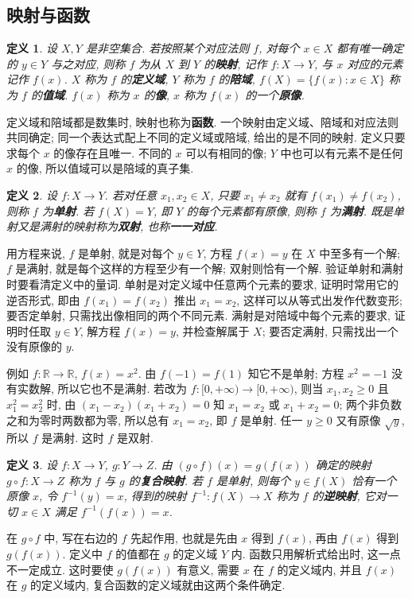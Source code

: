 \documentclass[UTF8,openany]{ctexbook}
\theoremstyle{chinesetextbook}
\newtheorem{definition}{定义}[section]
\begin{document}
\subsection{映射与函数}
\begin{definition}
设 $X,Y$ 是非空集合. 若按照某个对应法则 $f$, 对每个 $x\in X$ 都有唯一确定的 $y\in Y$ 与之对应, 则称 $f$ 为从 $X$ 到 $Y$ 的\textbf{映射}, 记作 $f:X\to Y$, 与 $x$ 对应的元素记作 $f(x)$. $X$ 称为 $f$ 的\textbf{定义域}, $Y$ 称为 $f$ 的\textbf{陪域}, $f(X)=\{f(x):x\in X\}$ 称为 $f$ 的\textbf{值域}. $f(x)$ 称为 $x$ 的\textbf{像}, $x$ 称为 $f(x)$ 的一个\textbf{原像}.
\end{definition}
定义域和陪域都是数集时, 映射也称为\textbf{函数}. 一个映射由定义域、陪域和对应法则共同确定; 同一个表达式配上不同的定义域或陪域, 给出的是不同的映射. 定义只要求每个 $x$ 的像存在且唯一. 不同的 $x$ 可以有相同的像; $Y$ 中也可以有元素不是任何 $x$ 的像, 所以值域可以是陪域的真子集.
\begin{definition}
设 $f:X\to Y$. 若对任意 $x_1,x_2\in X$, 只要 $x_1\ne x_2$ 就有 $f(x_1)\ne f(x_2)$, 则称 $f$ 为\textbf{单射}. 若 $f(X)=Y$, 即 $Y$ 的每个元素都有原像, 则称 $f$ 为\textbf{满射}. 既是单射又是满射的映射称为\textbf{双射}, 也称\textbf{一一对应}.
\end{definition}
用方程来说, $f$ 是单射, 就是对每个 $y\in Y$, 方程 $f(x)=y$ 在 $X$ 中至多有一个解; $f$ 是满射, 就是每个这样的方程至少有一个解; 双射则恰有一个解. 验证单射和满射时要看清定义中的量词. 单射是对定义域中任意两个元素的要求, 证明时常用它的逆否形式, 即由 $f(x_1)=f(x_2)$ 推出 $x_1=x_2$, 这样可以从等式出发作代数变形; 要否定单射, 只需找出像相同的两个不同元素. 满射是对陪域中每个元素的要求, 证明时任取 $y\in Y$, 解方程 $f(x)=y$, 并检查解属于 $X$; 要否定满射, 只需找出一个没有原像的 $y$.

例如 $f:\mathbb R\to\mathbb R$, $f(x)=x^2$. 由 $f(-1)=f(1)$ 知它不是单射; 方程 $x^2=-1$ 没有实数解, 所以它也不是满射. 若改为 $f:[0,+\infty)\to[0,+\infty)$, 则当 $x_1,x_2\ge0$ 且 $x_1^2=x_2^2$ 时, 由 $(x_1-x_2)(x_1+x_2)=0$ 知 $x_1=x_2$ 或 $x_1+x_2=0$; 两个非负数之和为零时两数都为零, 所以总有 $x_1=x_2$, 即 $f$ 是单射. 任一 $y\ge0$ 又有原像 $\sqrt y$, 所以 $f$ 是满射. 这时 $f$ 是双射.
\begin{definition}
设 $f:X\to Y$, $g:Y\to Z$. 由 $(g\circ f)(x)=g(f(x))$ 确定的映射 $g\circ f:X\to Z$ 称为 $f$ 与 $g$ 的\textbf{复合映射}. 若 $f$ 是单射, 则每个 $y\in f(X)$ 恰有一个原像 $x$, 令 $f^{-1}(y)=x$, 得到的映射 $f^{-1}:f(X)\to X$ 称为 $f$ 的\textbf{逆映射}, 它对一切 $x\in X$ 满足 $f^{-1}(f(x))=x$.
\end{definition}
在 $g\circ f$ 中, 写在右边的 $f$ 先起作用, 也就是先由 $x$ 得到 $f(x)$, 再由 $f(x)$ 得到 $g(f(x))$. 定义中 $f$ 的值都在 $g$ 的定义域 $Y$ 内. 函数只用解析式给出时, 这一点不一定成立. 这时要使 $g(f(x))$ 有意义, 需要 $x$ 在 $f$ 的定义域内, 并且 $f(x)$ 在 $g$ 的定义域内, 复合函数的定义域就由这两个条件确定.
\end{document}
